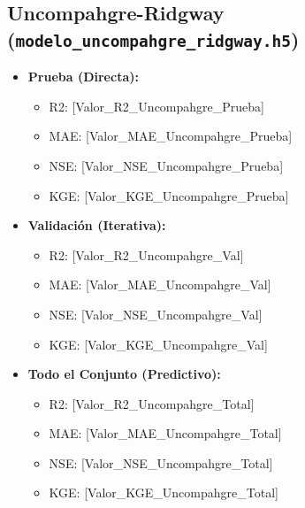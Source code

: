 \documentclass[12pt]{article}
\begin{document}
\subsection*{Uncompahgre-Ridgway (\texttt{modelo\_uncompahgre\_ridgway.h5})}
\begin{itemize}
    \item \textbf{Prueba (Directa):}
    \begin{itemize}
        \item R2: [Valor\_R2\_Uncompahgre\_Prueba]
        \item MAE: [Valor\_MAE\_Uncompahgre\_Prueba]
        \item NSE: [Valor\_NSE\_Uncompahgre\_Prueba]
        \item KGE: [Valor\_KGE\_Uncompahgre\_Prueba]
    \end{itemize}
    \item \textbf{Validación (Iterativa):}
    \begin{itemize}
        \item R2: [Valor\_R2\_Uncompahgre\_Val]
        \item MAE: [Valor\_MAE\_Uncompahgre\_Val]
        \item NSE: [Valor\_NSE\_Uncompahgre\_Val]
        \item KGE: [Valor\_KGE\_Uncompahgre\_Val]
    \end{itemize}
    \item \textbf{Todo el Conjunto (Predictivo):}
    \begin{itemize}
        \item R2: [Valor\_R2\_Uncompahgre\_Total]
        \item MAE: [Valor\_MAE\_Uncompahgre\_Total]
        \item NSE: [Valor\_NSE\_Uncompahgre\_Total]
        \item KGE: [Valor\_KGE\_Uncompahgre\_Total]
    \end{itemize}
\end{itemize}
\end{document}

